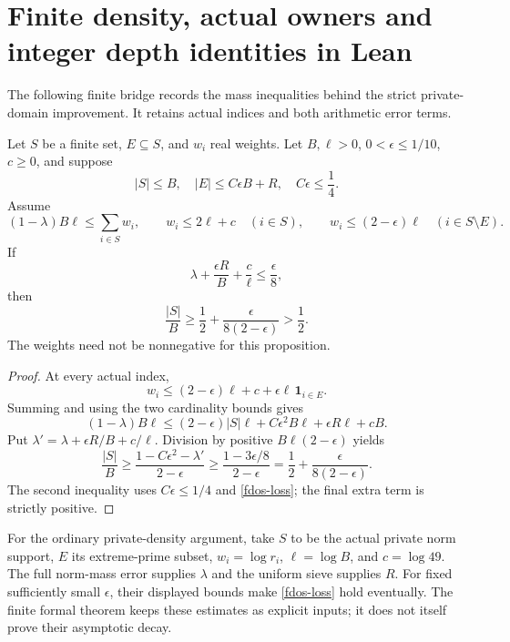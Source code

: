 \section{Finite density, actual owners and integer depth identities in Lean}
\label{fdos-section}

The following finite bridge records the mass inequalities behind the
strict private-domain improvement. It retains actual indices and both
arithmetic error terms.

\begin{proposition}\label{fdos-density}
Let $S$ be a finite set, $E\subseteq S$, and $w_i$ real weights.
Let $B,\ell>0$, $0<\epsilon\le1/10$, $c\ge0$, and suppose
\[
 |S|\le B,\quad |E|\le C\epsilon B+R,\quad C\epsilon\le\frac14.
\]
Assume
\[
 (1-\lambda)B\ell\le\sum_{i\in S}w_i,\qquad
 w_i\le2\ell+c\quad(i\in S),\qquad
 w_i\le(2-\epsilon)\ell\quad(i\in S\setminus E).
\]
If
\begin{equation}\label{fdos-loss}
 \lambda+\frac{\epsilon R}{B}+\frac c\ell\le\frac\epsilon8,
\end{equation}
then
\begin{equation}\label{fdos-gain}
 \frac{|S|}{B}\ge\frac12+\frac{\epsilon}{8(2-\epsilon)}>\frac12.
\end{equation}
The weights need not be nonnegative for this proposition.
\end{proposition}
\begin{proof}
At every actual index,
\[
 w_i\le(2-\epsilon)\ell+c+
             \epsilon\ell\,\mathbf1_{i\in E}.
\]
Summing and using the two cardinality bounds gives
\[
 (1-\lambda)B\ell
 \le (2-\epsilon)|S|\ell+C\epsilon^2B\ell+
                 \epsilon R\ell+cB.
\]
Put $\lambda'=\lambda+\epsilon R/B+c/\ell$. Division by positive
$B\ell(2-\epsilon)$ yields
\[
 \frac{|S|}{B}\ge\frac{1-C\epsilon^2-\lambda'}{2-\epsilon}
 \ge\frac{1-3\epsilon/8}{2-\epsilon}
 =\frac12+\frac{\epsilon}{8(2-\epsilon)}.
\]
The second inequality uses $C\epsilon\le1/4$ and
\eqref{fdos-loss}; the final extra term is strictly positive.
\end{proof}

For the ordinary private-density argument, take $S$ to be the actual
private norm support, $E$ its extreme-prime subset, $w_i=\log r_i$,
$\ell=\log B$, and $c=\log49$. The full norm-mass error supplies
$\lambda$ and the uniform sieve supplies $R$.
For fixed sufficiently small $\epsilon$, their displayed bounds make
\eqref{fdos-loss} hold eventually. The finite formal theorem keeps
these estimates as explicit inputs; it does not itself prove their
asymptotic decay.

